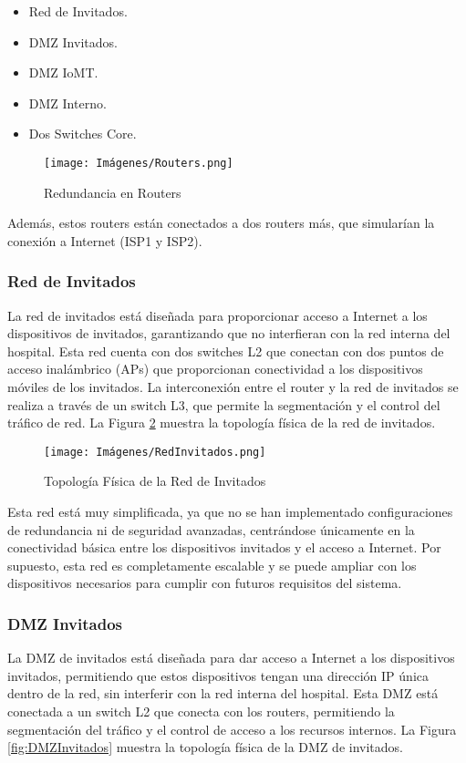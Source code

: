 \begin{itemize}
    \item Red de Invitados.
    \item DMZ Invitados.
    \item DMZ IoMT.
    \item DMZ Interno.
    \item Dos Switches Core.
\end{itemize}

\begin{figure}[H]
    \centering
    \texttt{[image: Imágenes/Routers.png]}
    \caption{Redundancia en Routers}
    \label{fig:Routers} 
\end{figure}

Además, estos routers están conectados a dos routers más, que simularían la conexión a Internet (ISP1 y ISP2).

\subsubsection{Red de Invitados}
La red de invitados está diseñada para proporcionar acceso a Internet a los dispositivos de invitados, garantizando que no interfieran con la red interna del hospital. Esta red 
cuenta con dos switches L2 que conectan con dos puntos de acceso inalámbrico (APs) que proporcionan conectividad a los dispositivos móviles de los invitados. La interconexión entre 
el router y la red de invitados se realiza a través de un switch L3, que permite la segmentación y el control del tráfico de red. La Figura \ref{fig:RedInvitados} muestra la topología 
física de la red de invitados.

\begin{figure}[H]
    \centering
    \texttt{[image: Imágenes/RedInvitados.png]}
    \caption{Topología Física de la Red de Invitados}
    \label{fig:RedInvitados}
\end{figure}

Esta red está muy simplificada, ya que no se han implementado configuraciones de redundancia ni de seguridad avanzadas, centrándose únicamente en la conectividad básica entre los dispositivos 
invitados y el acceso a Internet. Por supuesto, esta red es completamente escalable y se puede ampliar con los dispositivos necesarios para cumplir con futuros requisitos del sistema.

\subsubsection{DMZ Invitados}
La DMZ de invitados está diseñada para dar acceso a Internet a los dispositivos invitados, permitiendo que estos dispositivos tengan una dirección IP única dentro de la red, sin 
interferir con la red interna del hospital. Esta DMZ está conectada a un switch L2 que conecta con los routers, permitiendo la segmentación del tráfico y el control de acceso a los recursos 
internos. La Figura \ref{fig:DMZInvitados} muestra la topología física de la DMZ de invitados.

